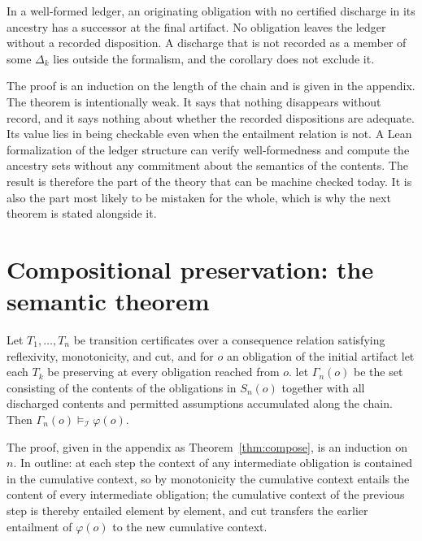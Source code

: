 \begin{corollary}[RV-017]
In a well-formed ledger, an originating obligation with no certified discharge in its ancestry has a successor at the final artifact. No obligation leaves the ledger without a recorded disposition. A discharge that is not recorded as a member of some $\Delta_k$ lies outside the formalism, and the corollary does not exclude it.
\end{corollary}

The proof is an induction on the length of the chain and is given in the appendix. The theorem is intentionally weak. It says that nothing disappears without record, and it says nothing about whether the recorded dispositions are adequate. Its value lies in being checkable even when the entailment relation is not. A Lean formalization of the ledger structure can verify well-formedness and compute the ancestry sets without any commitment about the semantics of the contents. The result is therefore the part of the theory that can be machine checked today. It is also the part most likely to be mistaken for the whole, which is why the next theorem is stated alongside it.

\section{Compositional preservation: the semantic theorem}

\begin{theorem}[RV-008]
\label{thm:rv008-ch}
Let $T_1, \dots, T_n$ be transition certificates over a consequence relation satisfying reflexivity, monotonicity, and cut, and for $o$ an obligation of the initial artifact let each $T_k$ be preserving at every obligation reached from $o$. let $\Gamma_n(o)$ be the set consisting of the contents of the obligations in $S_n(o)$ together with all discharged contents and permitted assumptions accumulated along the chain. Then $\Gamma_n(o) \models_{\mathcal{I}} \varphi(o)$.
\end{theorem}

The proof, given in the appendix as Theorem~\ref{thm:compose}, is an induction on $n$. In outline: at each step the context of any intermediate obligation is contained in the cumulative context, so by monotonicity the cumulative context entails the content of every intermediate obligation; the cumulative context of the previous step is thereby entailed element by element, and cut transfers the earlier entailment of $\varphi(o)$ to the new cumulative context.

